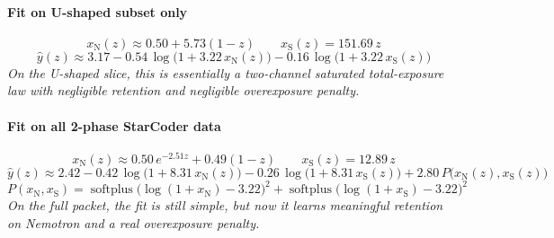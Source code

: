 

\paragraph{Fit on U-shaped subset only}
\[
x_{\mathrm{N}}(z) \approx 0.50 + 5.73(1-z)
\qquad
x_{\mathrm{S}}(z) = 151.69\,z
\]
\[
\hat y(z) \approx 3.17 - 0.54\,\log\!\bigl(1 + 3.22\,x_{\mathrm{N}}(z)\bigr) - 0.16\,\log\!\bigl(1 + 3.22\,x_{\mathrm{S}}(z)\bigr)
\]
\emph{On the U-shaped slice, this is essentially a two-channel saturated total-exposure law with negligible retention and negligible overexposure penalty.}

\paragraph{Fit on all 2-phase StarCoder data}
\[
x_{\mathrm{N}}(z) \approx 0.50\,e^{-2.51 z} + 0.49(1-z)
\qquad
x_{\mathrm{S}}(z) = 12.89\,z
\]
\[
\hat y(z) \approx 2.42 - 0.42\,\log\!\bigl(1 + 8.31\,x_{\mathrm{N}}(z)\bigr) - 0.26\,\log\!\bigl(1 + 8.31\,x_{\mathrm{S}}(z)\bigr) + 2.80\,P\bigl(x_{\mathrm{N}}(z), x_{\mathrm{S}}(z)\bigr)
\]
\[
P(x_{\mathrm{N}}, x_{\mathrm{S}}) = \operatorname{softplus}\!\bigl(\log(1+x_{\mathrm{N}})-3.22\bigr)^2 + \operatorname{softplus}\!\bigl(\log(1+x_{\mathrm{S}})-3.22\bigr)^2
\]
\emph{On the full packet, the fit is still simple, but now it learns meaningful retention on Nemotron and a real overexposure penalty.}
